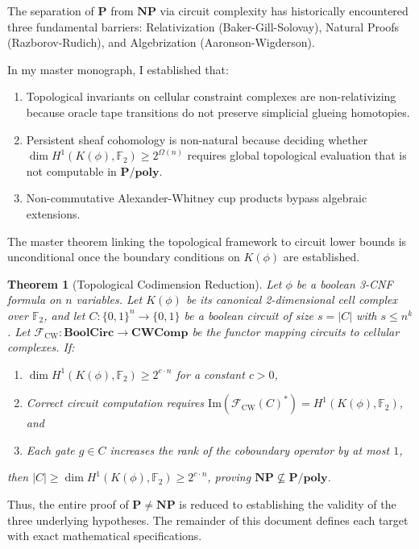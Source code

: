 \documentclass[11pt,a4paper]{article}
\theoremstyle{plain}
\newtheorem{theorem}{Theorem}[section]
\theoremstyle{definition}
\theoremstyle{remark}
\begin{document}
The separation of $\mathbf{P}$ from $\mathbf{NP}$ via circuit complexity has historically encountered three fundamental barriers: Relativization (Baker-Gill-Solovay), Natural Proofs (Razborov-Rudich), and Algebrization (Aaronson-Wigderson). 

In my master monograph, I established that:
\begin{enumerate}
    \item Topological invariants on cellular constraint complexes are non-relativizing because oracle tape transitions do not preserve simplicial glueing homotopies.
    \item Persistent sheaf cohomology is non-natural because deciding whether $\dim H^1(K(\phi), \mathbb{F}_2) \ge 2^{\Omega(n)}$ requires global topological evaluation that is not computable in $\mathbf{P/poly}$.
    \item Non-commutative Alexander-Whitney cup products bypass algebraic extensions.
\end{enumerate}

The master theorem linking the topological framework to circuit lower bounds is unconditional once the boundary conditions on $K(\phi)$ are established.

\begin{theorem}[Topological Codimension Reduction]\label{thm:master_reduction}
Let $\phi$ be a boolean 3-CNF formula on $n$ variables. Let $K(\phi)$ be its canonical 2-dimensional cell complex over $\mathbb{F}_2$, and let $C: \{0,1\}^n \to \{0,1\}$ be a boolean circuit of size $s = |C|$ with $s \le n^k$. Let $\mathcal{F}_{\mathrm{CW}}: \mathbf{BoolCirc} \to \mathbf{CWComp}$ be the functor mapping circuits to cellular complexes.
If:
\begin{enumerate}
    \item $\dim H^1(K(\phi), \mathbb{F}_2) \ge 2^{c \cdot n}$ for a constant $c > 0$,
    \item Correct circuit computation requires $\mathrm{Im}(\mathcal{F}_{\mathrm{CW}}(C)^*) = H^1(K(\phi), \mathbb{F}_2)$, and
    \item Each gate $g \in C$ increases the rank of the coboundary operator by at most $1$,
\end{enumerate}
then $|C| \ge \dim H^1(K(\phi), \mathbb{F}_2) \ge 2^{c \cdot n}$, proving $\mathbf{NP} \not\subseteq \mathbf{P/poly}$.
\end{theorem}

Thus, the entire proof of $\mathbf{P} \neq \mathbf{NP}$ is reduced to establishing the validity of the three underlying hypotheses. The remainder of this document defines each target with exact mathematical specifications.
\end{document}
